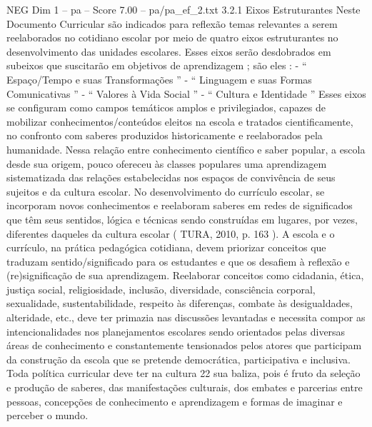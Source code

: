 \begin{textsample}{NEG Dim 1 – pa – Score 7.00 – pa/pa\_ef\_2.txt}  \label{ex:f1_neg_259}
3.2.1 Eixos Estruturantes Neste Documento Curricular são indicados para reflexão temas relevantes a serem reelaborados no cotidiano escolar por meio de quatro eixos estruturantes no desenvolvimento das unidades escolares.
Esses eixos serão desdobrados em subeixos que suscitarão em objetivos de aprendizagem ; são eles : - “ Espaço/Tempo e suas Transformações ” - “ Linguagem e suas Formas Comunicativas ” - “ Valores à Vida Social ” - “ Cultura e Identidade ” Esses eixos se configuram como campos temáticos amplos e privilegiados, capazes de mobilizar conhecimentos/conteúdos eleitos na escola e tratados cientificamente, no confronto com saberes produzidos historicamente e reelaborados pela humanidade.
Nessa relação entre conhecimento científico e saber popular, a escola desde sua origem, pouco ofereceu às classes populares uma aprendizagem sistematizada das relações estabelecidas nos espaços de convivência de seus sujeitos e da cultura escolar.
No desenvolvimento do currículo escolar, se incorporam novos conhecimentos e reelaboram saberes em redes de significados que têm seus sentidos, lógica e técnicas sendo construídas em lugares, por vezes, diferentes daqueles da cultura escolar ( TURA, 2010, p. 163 ).
A escola e o currículo, na prática pedagógica cotidiana, devem priorizar conceitos que traduzam sentido/significado para os estudantes e que os desafiem à reflexão e (re)significação de sua aprendizagem.
Reelaborar conceitos como cidadania, ética, justiça social, religiosidade, inclusão, diversidade, consciência corporal, sexualidade, sustentabilidade, respeito às diferenças, combate às desigualdades, alteridade, etc., deve ter primazia nas discussões levantadas e necessita compor as intencionalidades nos planejamentos escolares sendo orientados pelas diversas áreas de conhecimento e constantemente tensionados pelos atores que participam da construção da escola que se pretende democrática, participativa e inclusiva.
Toda política curricular deve ter na cultura 22 sua baliza, pois é fruto da seleção e produção de saberes, das manifestações culturais, dos embates e parcerias entre pessoas, concepções de conhecimento e aprendizagem e formas de imaginar e perceber o mundo.

\end{textsample}
